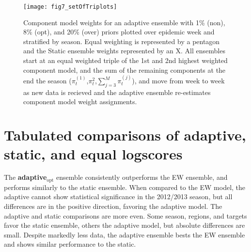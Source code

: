 \documentclass[12pt]{article}
\def\adaptOpt{\textbf{adaptive$_{\text{opt}}$ }}
\begin{document}
\graphicspath{{../_6_TLGs/_G/fig7_setOfTriPlots/}}
\begin{figure}[ht!]
    \centering
    \texttt{[image: fig7\_setOfTriplots]}
    \caption{Component model weights for an adaptive ensemble with 1\% (non), 8\% (opt), and 20\% (over) priors plotted over epidemic week and stratified by season.
    Equal weighting is represented by a pentagon and the Static ensemble weights represented by an X.
    All ensembles start at an equal weighted triple of the 1st and 2nd highest weighted component model, and the sum of the remaining components at the end the season ($\pi_{t}^{(1)}$,$\pi_{t}^{2}$,$\sum_{j=3}^{M}\pi_{t}^{(j)}$), and move from week to week as new data is recieved and the adaptive ensemble re-estimates component model weight assignments.
        \label{fig.bagOfDoritos}}
\end{figure}


\section{Tabulated comparisons of adaptive, static, and equal logscores}
\label{tbRegress}

The \adaptOpt ensemble consistently outperforms the EW ensemble, and performs similarly to the static ensemble.
When compared to the EW model, the adaptive cannot show statistical significance in the 2012/2013 season, but all differences are in the positive direction, favoring the adaptive model.
The adaptive and static comparisons are more even.
Some season, regions, and targets favor the static ensemble, others the adaptive model, but absolute differences are small.
Despite markedly less data, the adaptive ensemble bests the EW ensemble and shows similar performance to the static.
\end{document}
